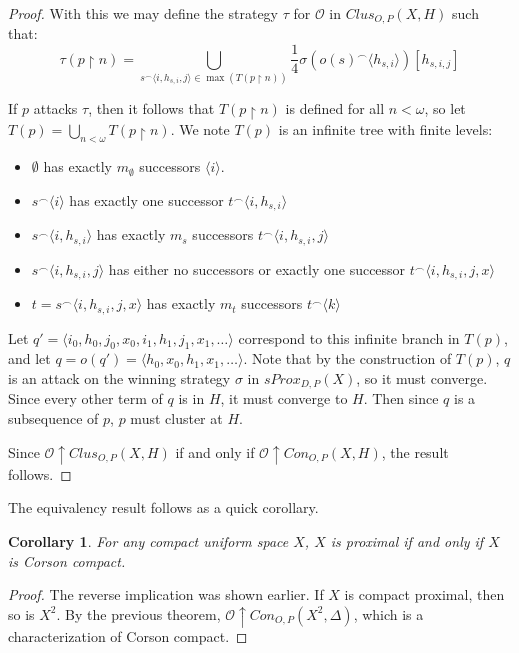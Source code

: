 \documentclass{amsart}
\newtheorem{cor}[thm]{Corollary}
\theoremstyle{definition}
\theoremstyle{remark}
\newcommand{\<}{\langle}
\renewcommand{\>}{\rangle}
\newcommand{\sproxgame}[1]{sProx_{D,P}(#1)}
\newcommand{\congame}[2]{Con_{O,P}(#1,#2)}
\newcommand{\clusgame}[2]{Clus_{O,P}(#1,#2)}
\newcommand{\pl}[1]{\mathscr{#1}}
\newcommand{\win}{\uparrow}
\newcommand{\rest}{\restriction}
\newcommand{\concat}{^\frown}
\begin{document}
\begin{proof}
  With this we may define the strategy $\tau$ for $\pl O$ in $\clusgame{X}{H}$ such that:
  \[
    \tau(p\rest n) = \bigcup_{s\concat\<i,h_{s,i},j\>\in\max(T(p\rest n))} \frac{1}{4}\sigma(o(s)\concat\<h_{s,i}\>)[h_{s,i,j}]
  \]

  If $p$ attacks $\tau$, then it follows that $T(p\rest n)$ is defined for all $n<\omega$, so let $T(p)=\bigcup_{n<\omega} T(p\rest n)$. We note $T(p)$ is an infinite tree with finite levels:
    \begin{itemize}
      \item $\emptyset$ has exactly $m_\emptyset$ successors $\<i\>$.
      \item $s\concat\<i\>$ has exactly one successor $t\concat\<i,h_{s,i}\>$
      \item $s\concat\<i,h_{s,i}\>$ has exactly $m_s$ successors $t\concat\<i,h_{s,i},j\>$
      \item $s\concat\<i,h_{s,i},j\>$ has either no successors or exactly one successor $t\concat\<i,h_{s,i},j,x\>$
      \item $t=s\concat\<i,h_{s,i},j,x\>$ has exactly $m_t$ successors $t\concat\<k\>$
    \end{itemize}

  Let $q'=\<i_0,h_0,j_0,x_0,i_1,h_1,j_1,x_1,\dots\>$ correspond to this infinite branch in $T(p)$, and let $q=o(q')=\<h_0,x_0,h_1,x_1,\dots\>$. Note that by the construction of $T(p)$, $q$ is an attack on the winning strategy $\sigma$ in $\sproxgame{X}$, so it must converge. Since every other term of $q$ is in $H$, it must converge to $H$. Then since $q$ is a subsequence of $p$, $p$ must cluster at $H$.

  Since $\pl O\win\clusgame{X}{H}$ if and only if $\pl O\win\congame{X}{H}$, the result follows.
\end{proof}

The equivalency result follows as a quick corollary.

\begin{cor}
  For any compact uniform space $X$, $X$ is proximal if and only if $X$ is Corson compact.
\end{cor}

\begin{proof}
  The reverse implication was shown earlier. If $X$ is compact proximal, then so is $X^2$. By the previous theorem, $\pl O\win\congame{X^2}{\Delta}$, which is a characterization of Corson compact.
\end{proof}
\end{document}
